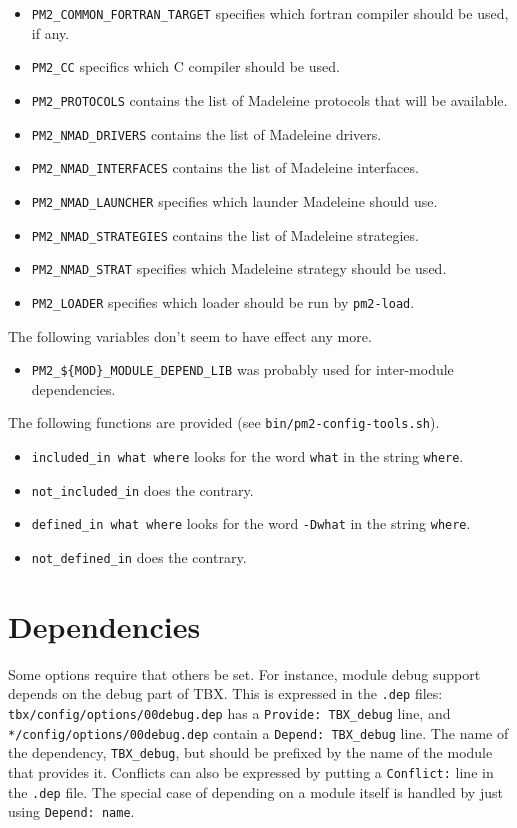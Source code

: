 \documentclass[11pt, a4paper ,twoside]{article}
\begin{document}
\begin{itemize}
\item \verb+PM2_COMMON_FORTRAN_TARGET+ specifies which fortran compiler
should be used, if any.
\item \verb+PM2_CC+ specifics which C compiler should be used.
\item \verb+PM2_PROTOCOLS+ contains the list of Madeleine protocols that
will be available.
\item \verb+PM2_NMAD_DRIVERS+ contains the list of Madeleine drivers.
\item \verb+PM2_NMAD_INTERFACES+ contains the list of Madeleine
interfaces.
\item \verb+PM2_NMAD_LAUNCHER+ specifies which launder Madeleine should
use.
\item \verb+PM2_NMAD_STRATEGIES+ contains the list of Madeleine
strategies.
\item \verb+PM2_NMAD_STRAT+ specifies which Madeleine strategy should
be used.
\item \verb+PM2_LOADER+ specifies which loader should be run by
\verb+pm2-load+.
\end{itemize}

The following variables don't seem to have effect any more.
\begin{itemize}
\item \verb+PM2_${MOD}_MODULE_DEPEND_LIB+ was probably used for
inter-module dependencies.
\end{itemize}

The following functions are provided (see \verb+bin/pm2-config-tools.sh+).
\begin{itemize}
\item \verb+included_in what where+ looks for the word \verb+what+ in
the string \verb+where+.
\item \verb+not_included_in+ does the contrary.
\item \verb+defined_in what where+ looks for the word \verb+-Dwhat+ in
the string \verb+where+.
\item \verb+not_defined_in+ does the contrary.
\end{itemize}


\section{Dependencies}

Some options require that others be set.  For instance, module debug
support depends on the debug part of TBX.  This is expressed in
the \verb+.dep+ files: \verb+tbx/config/options/00debug.dep+ has a
\verb+Provide: TBX_debug+ line, and \verb+*/config/options/00debug.dep+
contain a \verb+Depend: TBX_debug+ line. The name of the dependency,
\verb+TBX_debug+, but should be prefixed by the name of the module that
provides it. Conflicts can also be expressed by putting a
\verb+Conflict:+ line in the \verb+.dep+ file. The special case of
depending on a module itself is handled by just using
\verb+Depend: name+.
\end{document}
